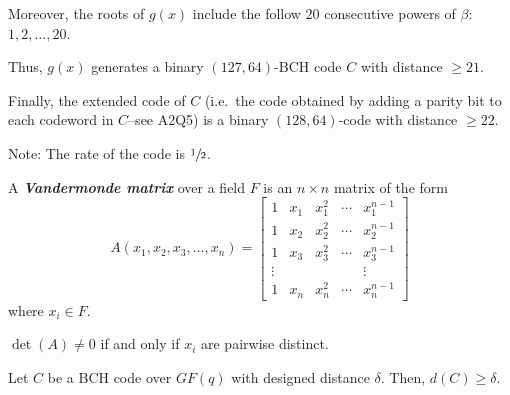 \begin{exbox}
\begin{example}
        Moreover, the roots of $ g(x) $ include the follow $ 20 $
        consecutive powers of $ \beta $: $ 1,2,\ldots ,20 $.

        Thus, $ g(x) $ generates a binary $ (127,64) $-BCH code
        $ C $ with distance $ \geqslant 21 $.

        Finally, the extended code of $ C $ (i.e.\ the code obtained
        by adding a parity bit to each codeword in $ C $--see A2Q5) is
        a binary $ (128,64) $-code with distance $ \geqslant 22 $.

        Note: The rate of the code is $ \sfrac{1}{2} $.
    \end{example}
\end{exbox}

\begin{defbox}
    \begin{definition}
        A \textbf{\emph{Vandermonde matrix}} over a field $ F $ is an
        $ n\times n $ matrix of the form
        \[ A\left(x_{1}, x_{2}, x_{3}, \ldots, x_{n}\right)=\left[\begin{array}{ccccc}
                    1      & x_{1} & x_{1}^{2} & \cdots & x_{1}^{n-1} \\
                    1      & x_{2} & x_{2}^{2} & \cdots & x_{2}^{n-1} \\
                    1      & x_{3} & x_{3}^{2} & \cdots & x_{3}^{n-1} \\
                    \vdots &       &           &        & \vdots      \\
                    1      & x_{n} & x_{n}^{2} & \cdots & x_{n}^{n-1}
                \end{array}\right] \]
        where $ x_i\in F $.
    \end{definition}
\end{defbox}

\begin{thmbox}
    \begin{theorem}
        $ \det(A)\neq 0 $ if and only if $ x_i $ are pairwise distinct.
    \end{theorem}
\end{thmbox}

\begin{thmbox}
    \begin{theorem}
        Let $ C $ be a BCH code over $ GF(q) $ with designed
        distance $ \delta $. Then, $ d(C)\geqslant \delta $.
    \end{theorem}
\end{thmbox}

